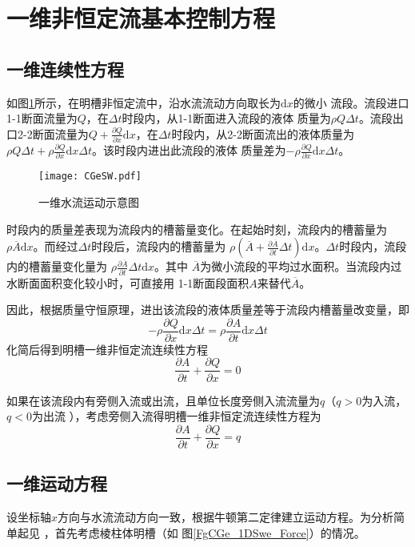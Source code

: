 \section{一维非恒定流基本控制方程}
\subsection{一维连续性方程}
如图\ref{FgCGe_1DSwe}所示，在明槽非恒定流中，沿水流流动方向取长为$\mathrm{d}x$的微小
流段。流段进口1-1断面流量为$Q$，在$\Delta t$时段内，从1-1断面进入流段的液体
质量为$\rho Q\Delta t$。流段出口2-2断面流量为$Q+\frac{\partial Q}{\partial
x}\mathrm{d}x$，在$\Delta t$时段内，从2-2断面流出的液体质量为$\rho Q\Delta
t+\rho\frac{\partial Q}{\partial x}\mathrm{d}x\Delta t$。该时段内进出此流段的液体
质量差为$-\rho\frac{\partial Q}{\partial x}\mathrm{d}x\Delta t$。


\begin{figure}[hb]
  \centering
  \texttt{[image: CGeSW.pdf]}
  \caption{一维水流运动示意图}
  \label{FgCGe_1DSwe}
\end{figure}


时段内的质量差表现为流段内的槽蓄量变化。在起始时刻，流段内的槽蓄量为
$\rho\overline{A}\mathrm{d}x$。而经过$\Delta t$时段后，流段内的槽蓄量为
$\rho\left(\overline{A}+\frac{\partial\overline{A}}{\partial t}\Delta
t\right)\mathrm{d}x$。$\Delta t$时段内，流段内的槽蓄量变化量为
$\rho\frac{\partial \overline{A}}{\partial t}\Delta t\mathrm{d}x$。其中
$\overline{A}$为微小流段的平均过水面积。当流段内过水断面面积变化较小时，可直接用
1-1断面段面积$A$来替代$\overline{A}$。

因此，根据质量守恒原理，进出该流段的液体质量差等于流段内槽蓄量改变量，即
\begin{equation*}
  -\rho\frac{\partial Q}{\partial x}\mathrm{d}x\Delta t
  =
  \rho\frac{\partial A}{\partial t}\mathrm{d}x\Delta t
\end{equation*}
化简后得到明槽一维非恒定流连续性方程
\begin{equation}
  \frac{\partial A}{\partial t}
  +
  \frac{\partial Q}{\partial x}
  =
  0
  \label{EqCGe_SVe_Ce}
\end{equation}

如果在该流段内有旁侧入流或出流，且单位长度旁侧入流流量为$q$（$q>0$为入流，$q<0$为出流
），考虑旁侧入流得明槽一维非恒定流连续性方程为
\begin{equation}
  \frac{\partial A}{\partial t}
  +
  \frac{\partial Q}{\partial x}
  =
  q
\end{equation}

\subsection{一维运动方程}
设坐标轴$x$方向与水流流动方向一致，根据牛顿第二定律建立运动方程。为分析简单起见
，首先考虑棱柱体明槽（如
图\ref{FgCGe_1DSwe_Force}）的情况。

